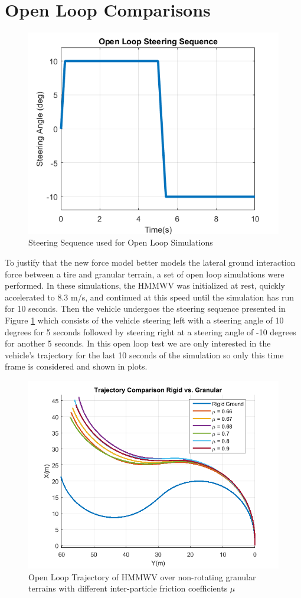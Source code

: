 \documentclass[12pt,onecolumn]{report}
\begin{document}
\section{Open Loop Comparisons}\label{s:OpenLoop}

\begin{figure}
	\centering
	\includegraphics[width=0.8\columnwidth]{Figs/openLoopSteer.png}
	\caption{\small Steering Sequence used for Open Loop Simulations}  
	\label{fig:openSteer}
\end{figure}

To justify that the new force model better models the lateral ground interaction force between a tire and granular terrain, a set of open loop simulations were performed. In these simulations, the HMMWV was initialized at rest, quickly accelerated to 8.3 m/s, and continued at this speed until the simulation has run for 10 seconds. Then the vehicle undergoes the steering sequence presented in Figure \ref{fig:openSteer} which consists of the vehicle steering left with a steering angle of 10 degrees for 5 seconds followed by steering right at a steering angle of -10 degrees for another 5 seconds. In this open loop test we are only interested in the vehicle's trajectory for the last 10 seconds of the simulation so only this time frame is considered and shown in plots.

\begin{figure}
	\centering
	\includegraphics[width=0.8\columnwidth]{Figs/trajectoryComparison_png.png}
	\caption{\small Open Loop Trajectory of HMMWV over non-rotating granular terrains with different inter-particle friction coefficients $\mu$}  
	\label{fig:openLoopmu}
\end{figure}
\end{document}
